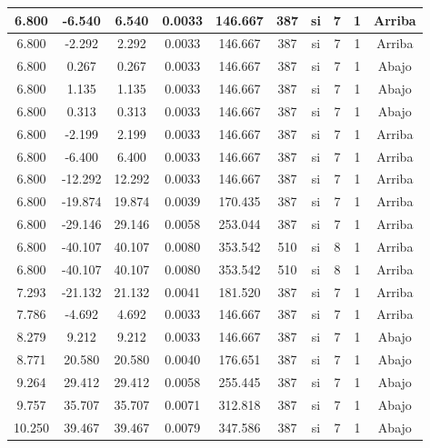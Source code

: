 \begin{table}[H]
{\begin{tabular}{|c|c|c|c|c|c|c|c|c|c|}
    \hline
    6.800 & -6.540 & 6.540 & 0.0033 & 146.667 & 387 & si  & 7   & 1   & Arriba \bigstrut\\
    \hline
    6.800 & -2.292 & 2.292 & 0.0033 & 146.667 & 387 & si  & 7   & 1   & Arriba \bigstrut\\
    \hline
    6.800 & 0.267 & 0.267 & 0.0033 & 146.667 & 387 & si  & 7   & 1   & Abajo \bigstrut\\
    \hline
    6.800 & 1.135 & 1.135 & 0.0033 & 146.667 & 387 & si  & 7   & 1   & Abajo \bigstrut\\
    \hline
    6.800 & 0.313 & 0.313 & 0.0033 & 146.667 & 387 & si  & 7   & 1   & Abajo \bigstrut\\
    \hline
    6.800 & -2.199 & 2.199 & 0.0033 & 146.667 & 387 & si  & 7   & 1   & Arriba \bigstrut\\
    \hline
    6.800 & -6.400 & 6.400 & 0.0033 & 146.667 & 387 & si  & 7   & 1   & Arriba \bigstrut\\
    \hline
    6.800 & -12.292 & 12.292 & 0.0033 & 146.667 & 387 & si  & 7   & 1   & Arriba \bigstrut\\
    \hline
    6.800 & -19.874 & 19.874 & 0.0039 & 170.435 & 387 & si  & 7   & 1   & Arriba \bigstrut\\
    \hline
    6.800 & -29.146 & 29.146 & 0.0058 & 253.044 & 387 & si  & 7   & 1   & Arriba \bigstrut\\
    \hline
    6.800 & -40.107 & 40.107 & 0.0080 & 353.542 & 510 & si  & 8   & 1   & Arriba \bigstrut\\
    \hline
    6.800 & -40.107 & 40.107 & 0.0080 & 353.542 & 510 & si  & 8   & 1   & Arriba \bigstrut\\
    \hline
    7.293 & -21.132 & 21.132 & 0.0041 & 181.520 & 387 & si  & 7   & 1   & Arriba \bigstrut\\
    \hline
    7.786 & -4.692 & 4.692 & 0.0033 & 146.667 & 387 & si  & 7   & 1   & Arriba \bigstrut\\
    \hline
    8.279 & 9.212 & 9.212 & 0.0033 & 146.667 & 387 & si  & 7   & 1   & Abajo \bigstrut\\
    \hline
    8.771 & 20.580 & 20.580 & 0.0040 & 176.651 & 387 & si  & 7   & 1   & Abajo \bigstrut\\
    \hline
    9.264 & 29.412 & 29.412 & 0.0058 & 255.445 & 387 & si  & 7   & 1   & Abajo \bigstrut\\
    \hline
    9.757 & 35.707 & 35.707 & 0.0071 & 312.818 & 387 & si  & 7   & 1   & Abajo \bigstrut\\
    \hline
    10.250 & 39.467 & 39.467 & 0.0079 & 347.586 & 387 & si  & 7   & 1   & Abajo \bigstrut\\

\end{tabular}}
\end{table}
